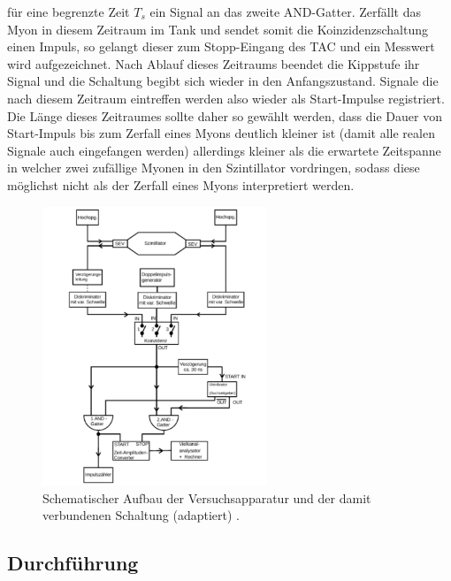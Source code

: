 für eine begrenzte Zeit $T_s$ ein Signal an das zweite AND-Gatter. Zerfällt das
Myon in diesem Zeitraum im Tank und sendet somit die Koinzidenzschaltung einen
Impuls, so gelangt dieser zum Stopp-Eingang des TAC und ein Messwert wird
aufgezeichnet. Nach Ablauf dieses Zeitraums beendet die Kippstufe ihr Signal und
die Schaltung begibt sich wieder in den Anfangszustand. Signale die nach diesem
Zeitraum eintreffen werden also wieder als Start-Impulse registriert. Die Länge
dieses Zeitraumes sollte daher so gewählt werden, dass die Dauer von Start-Impuls
bis zum Zerfall eines Myons deutlich kleiner ist (damit alle realen Signale
auch eingefangen werden) allerdings kleiner als die erwartete Zeitspanne in
welcher zwei zufällige Myonen in den Szintillator vordringen, sodass diese
möglichst nicht als der Zerfall eines Myons interpretiert werden. %
\begin{figure}[htb]
  \centering
  \includegraphics[width=0.6\textwidth]{figures/versuchsaufbau_adapt.pdf}
  \caption{Schematischer Aufbau der Versuchsapparatur und der damit verbundenen Schaltung (adaptiert) \cite{V01}.}
  \label{fig:aufbau}
\end{figure}
%
\subsection{Durchführung}

